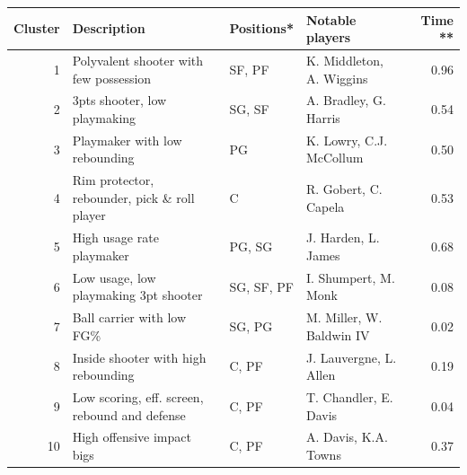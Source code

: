 \begin{tabular}{rlllr}
  \toprule
  Cluster & Description & Positions* & Notable players & Time ** \\
  \midrule
  1 & Polyvalent shooter with few possession & SF, PF & K. Middleton, A. Wiggins & 0.96 \\
  \midrule
  2 & 3pts shooter, low playmaking & SG, SF & A. Bradley, G. Harris & 0.54 \\
  \midrule
  3 & Playmaker with low rebounding & PG & K. Lowry, C.J. McCollum & 0.50 \\
  \midrule
  4 & Rim protector, rebounder, pick \& roll player & C & R. Gobert, C. Capela & 0.53 \\
  \midrule
  5 & High usage rate playmaker & PG, SG & J. Harden, L. James & 0.68 \\
  \midrule
  6 & Low usage, low playmaking 3pt shooter & SG, SF, PF & I. Shumpert, M. Monk & 0.08 \\
  \midrule
  7 & Ball carrier with low FG\% & SG, PG & M. Miller, W. Baldwin IV & 0.02 \\
  \midrule
  8 & Inside shooter with high rebounding & C, PF & J. Lauvergne, L. Allen & 0.19 \\
  \midrule
  9 & Low scoring, eff. screen, rebound and defense & C, PF & T. Chandler, E. Davis & 0.04 \\
  \midrule
  10 & High offensive impact bigs & C, PF & A. Davis, K.A. Towns & 0.37 \\
  \bottomrule
  \end{tabular}
  